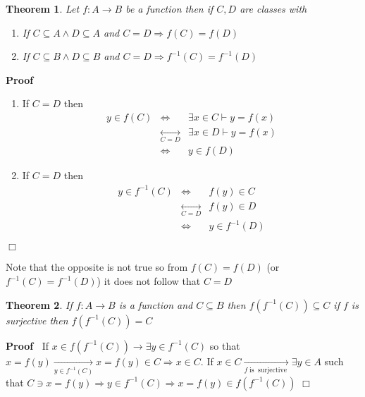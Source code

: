 \documentclass{book}
\newcommand{\Leftrightarrowlim}{\mathop{\leftrightarrow}\limits}
\newcommand{\Rightarrowlim}{\mathop{\rightarrow}\limits}
\newcommand{\tmop}[1]{\ensuremath{\operatorname{#1}}}
\newenvironment{proof}{\noindent\textbf{Proof\ }}{\hspace*{\fill}$\Box$\medskip}
\newtheorem{theorem}{Theorem}
\begin{document}
{{\begin{theorem}
  Let $f : A \rightarrow B$ be a function then if $C, D$ are classes with
  \begin{enumerate}
    \item If $C \subseteq A \wedge D \subseteq A$ and $C = D \Rightarrow f (C)
    = f (D)$
    
    \item If $C \subseteq B \wedge D \subseteq B$ and $C = D \Rightarrow f^{-
    1} (C) = f^{- 1} (D)$
  \end{enumerate}
\end{theorem}

\begin{proof}
  
  \begin{enumerate}
    \item If $C = D$ then
    \begin{eqnarray*}
      y \in f (C) & \Leftrightarrow & \exists x \in C \vdash y = f (x)\\
      & \Leftrightarrowlim_{C = D} & \exists x \in D \vdash y = f (x)\\
      & \Leftrightarrow & y \in f (D)
    \end{eqnarray*}
    \item If $C = D$ then
    \begin{eqnarray*}
      y \in f^{- 1} (C) & \Leftrightarrow & f (y) \in C\\
      & \Leftrightarrowlim_{C = D} & f (y) \in D\\
      & \Leftrightarrow & y \in f^{- 1} (D)
    \end{eqnarray*}
  \end{enumerate}
\end{proof}

Note that the opposite is not true so from $f (C) = f (D)$ (or $f^{- 1} (C) =
f^{- 1} (D)$) it does not follow that $C = D$

\begin{theorem}
  \label{surjective function and image/preimage}If $f : A \rightarrow B$ is a
  function and $C \subseteq B$ then $f (f^{- 1} (C)) \subseteq C$ if $f$ is
  surjective then $f (f^{- 1} (C)) = C$
\end{theorem}

\begin{proof}
  If $x \in f (f^{- 1} (C)) \Rightarrowlim \exists y \in f^{- 1} (C)$ so that
  $x = f (y) \Rightarrowlim_{y \in f^{- 1} (C)} x = f (y) \in C \Rightarrow x
  \in C$. If $x \in C \Rightarrowlim_{f \tmop{is} \tmop{surjective}} \exists y
  \in A$ such that $C \ni x = f (y) \Rightarrow y \in f^{- 1} (C) \Rightarrow
  x = f (y) \in f (f^{- 1} (C))$
\end{proof}

}}
\end{document}
